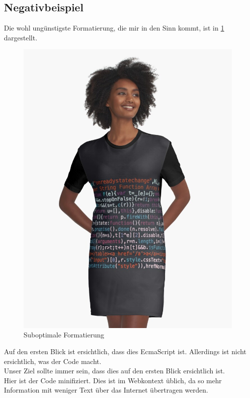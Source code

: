 	\subsection{Negativbeispiel}
		Die wohl ungünstigste Formatierung, die mir in den Sinn kommt, ist in \ref{fig:suboptimal-formatting} dargestellt.
		\begin{figure}[ht!]
			\caption{Suboptimale Formatierung \autocite{unknown-author-no-date}}
			\label{fig:suboptimal-formatting}
			\centering
			\includegraphics[width=\paperwidth/4]{shirt.jpg}
		\end{figure}
		Auf den ersten Blick ist ersichtlich, dass dies EcmaScript ist.
		Allerdings ist nicht ersichtlich, was der Code macht.\\
		Unser Ziel sollte immer sein, dass dies auf den ersten Blick ersichtlich ist.\\
		Hier ist der Code minifiziert. 
		Dies ist im Webkontext üblich, da so mehr Information mit weniger Text über das Internet übertragen werden.
